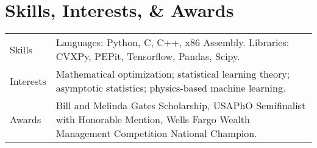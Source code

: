 \documentclass[a4paper,10pt]{article}
\begin{document}

\section{Skills, Interests, \& Awards}
\begin{tabularx}{\linewidth}{@{}l X@{}}
Skills & \normalsize{ Languages: Python, C, C++, x86 Assembly. Libraries: CVXPy, PEPit, Tensorflow, Pandas, Scipy.}\\[2pt]
Interests & \normalsize{Mathematical optimization; statistical learning theory; asymptotic statistics; physics-based machine learning.}\\[2pt]
Awards & \normalsize{Bill and Melinda Gates Scholarship, USAPhO Semifinalist with Honorable Mention, Wells Fargo Wealth Management Competition National Champion.}
\end{tabularx}

\end{document}
